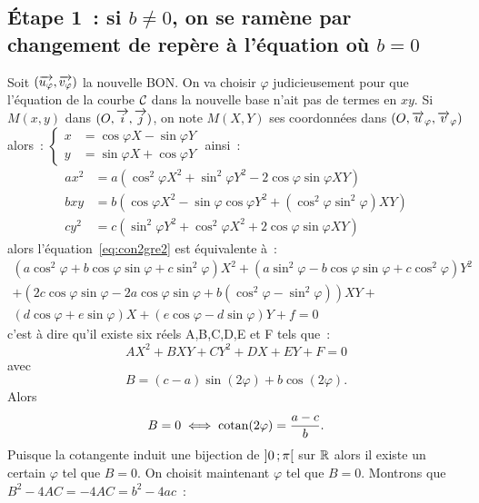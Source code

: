 \subsection{Étape 1~: si \(b\neq 0\), on se ramène par changement de repère à l'équation où \(b=0\)}
Soit \((\overrightarrow{u_{\varphi}},\overrightarrow{v_{\varphi}})\) la nouvelle BON\@. On va choisir \(\varphi\) judicieusement pour que l'équation de la courbe \(\mathcal{C}_{{}}\) dans la nouvelle base n'ait pas de termes en \(xy\). Si \(M(x,y)\) dans \((O,\overrightarrow{i},\overrightarrow{j})\), on note \(M(X,Y)\) ses coordonnées dans \((O,\overrightarrow{u}_\varphi,\overrightarrow{v}_\varphi)\) alors~:
\(\begin{cases} x&=\cos\varphi X - \sin\varphi Y \\ y&=\sin\varphi X + \cos\varphi Y\end{cases}\) ainsi~:
\begin{align}
  ax^2&=a(\cos^2\varphi X^2 + \sin^2\varphi Y^2 - 2\cos\varphi\sin\varphi XY)\\
  bxy&=b(\cos\varphi X^2 -\sin\varphi\cos\varphi Y^2 + (\cos^2\varphi \sin^2\varphi)XY)\\
  cy^2&=c(\sin^2\varphi Y^2 + \cos^2\varphi X^2 + 2\cos\varphi\sin\varphi XY)
\end{align}
alors l'équation~\eqref{eq:con2gre2} est équivalente à~:
\begin{multline}
 (a\cos^2\varphi + b\cos\varphi\sin\varphi +c\sin^2\varphi)X^2+(a\sin^2\varphi - b\cos\varphi\sin\varphi +c\cos^2\varphi)Y^2\\+(2c\cos\varphi\sin\varphi-2a\cos\varphi\sin\varphi+b(\cos^2\varphi - \sin^2\varphi))XY + \\ (d\cos\varphi + e\sin\varphi)X +(e\cos\varphi - d\sin\varphi)Y +f=0
\end{multline}
c'est à dire qu'il existe six réels A,B,C,D,E et F tels que~:
\begin{equation}
  AX^2+BXY+CY^2+DX+EY+F=0 \label{eq:eqz}
\end{equation}
avec
\begin{equation}
 B=(c-a)\sin(2\varphi)+b\cos(2\varphi).
\end{equation}
Alors
\begin{equation}
 B=0 \iff \operatorname{cotan}(2\varphi)=\frac{a-c}{b}.
\end{equation}
Puisque la cotangente induit une bijection de \(\left] 0 \, ;  \pi \right[\) sur \(\mathbb{R}\) alors il existe un certain \(\varphi\) tel que \(B=0\). On choisit maintenant \(\varphi\) tel que \(B=0\). Montrons que \(B^2-4AC=-4AC=b^2-4ac\)~:
